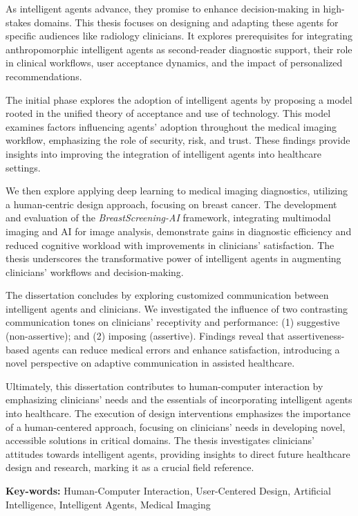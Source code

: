 
\vspace*{-7.50mm}%

As intelligent agents advance, they promise to enhance decision-making in high-stakes domains.
This thesis focuses on designing and adapting these agents for specific audiences like radiology clinicians.
It explores prerequisites for integrating anthropomorphic intelligent agents as second-reader diagnostic support, their role in clinical workflows, user acceptance dynamics, and the impact of personalized recommendations.

The initial phase explores the adoption of intelligent agents by proposing a model rooted in the unified theory of acceptance and use of technology.
This model examines factors influencing agents' adoption throughout the medical imaging workflow, emphasizing the role of security, risk, and trust.
These findings provide insights into improving the integration of intelligent agents into healthcare settings.

We then explore applying deep learning to medical imaging diagnostics, utilizing a human-centric design approach, focusing on breast cancer.
The development and evaluation of the {\it BreastScreening-AI} framework, integrating multimodal imaging and AI for image analysis, demonstrate gains in diagnostic efficiency and reduced cognitive workload with improvements in clinicians' satisfaction.
The thesis underscores the transformative power of intelligent agents in augmenting clinicians' workflows and decision-making.

The dissertation concludes by exploring customized communication between intelligent agents and clinicians.
We investigated the influence of two contrasting communication tones on clinicians' receptivity and performance:
(1) suggestive (non-assertive); and
(2) imposing (assertive).
Findings reveal that assertiveness-based agents can reduce medical errors and enhance satisfaction, introducing a novel perspective on adaptive communication in assisted healthcare.

Ultimately, this dissertation contributes to human-computer interaction by emphasizing clinicians' needs and the essentials of incorporating intelligent agents into healthcare.
The execution of design interventions emphasizes the importance of a human-centered approach, focusing on clinicians' needs in developing novel, accessible solutions in critical domains.
The thesis investigates clinicians' attitudes towards intelligent agents, providing insights to direct future healthcare design and research, marking it as a crucial field reference.

\vfil

\noindent
{\bf Key-words:} Human-Computer Interaction, User-Centered Design, Artificial Intelligence, Intelligent Agents, Medical Imaging